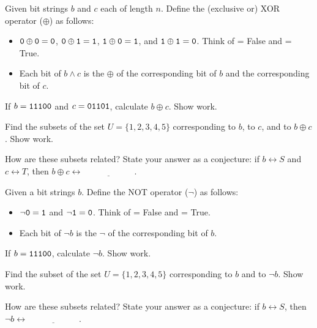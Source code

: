 \begin{exer}[\exerU] %
\label{exer_bs_rep_XOR}
    Given bit strings $b$ and $c$ each of length $n$.  Define the (exclusive or) XOR operator ($\oplus$) as follows:
        \begin{itemize}
            \item $\texttt{0} \oplus \texttt{0} = \texttt{0}$, $\texttt{0} \oplus \texttt{1} = \texttt{1}$, $\texttt{1} \oplus \texttt{0} = \texttt{1}$, and $\texttt{1} \oplus \texttt{1} = \texttt{0}$.  Think of  = False and  = True.
            \item Each bit of $b \land c$ is the $\oplus$ of the corresponding bit of $b$ and the corresponding bit of $c$.
        \end{itemize}

        \begin{exerpart}
            \item If $b = \texttt{11100}$ and $c = \texttt{01101}$, calculate $b \oplus c$. Show work.  
            \item Find the subsets of the set $U = \{1,2, 3, 4, 5\}$ corresponding to $b$, to $c$, and to $b \oplus c$.  Show work.  
            \item How are these subsets related?  State your answer as a conjecture: if $b \leftrightarrow S$ and $c  \leftrightarrow T$, then $b \oplus c \leftrightarrow \underline{\hspace{1in}}$.
        \end{exerpart}
\end{exer}

\begin{exer}[\exerU] %
\label{exer_bs_rep_NOT}
    Given a bit strings $b$.  Define the NOT operator ($\neg$) as follows:
        \begin{itemize}
            \item $\neg\texttt{0} = \texttt{1}$ and $\neg \texttt{1} = \texttt{0}$.  Think of  = False and  = True.
            \item Each bit of $\neg b$ is the $\neg$ of the corresponding bit of $b$.
        \end{itemize}

        \begin{exerpart}
            \item If $b = \texttt{11100}$, calculate $\neg b$. Show work.  
            \item Find the subset of the set $U = \{1,2, 3, 4, 5\}$ corresponding to $b$ and to $\neg b $.  Show work.  
            \item How are these subsets related?  State your answer as a conjecture: if $b \leftrightarrow S$, then $\neg b \leftrightarrow \underline{\hspace{1in}}$.
        \end{exerpart}
\end{exer}


